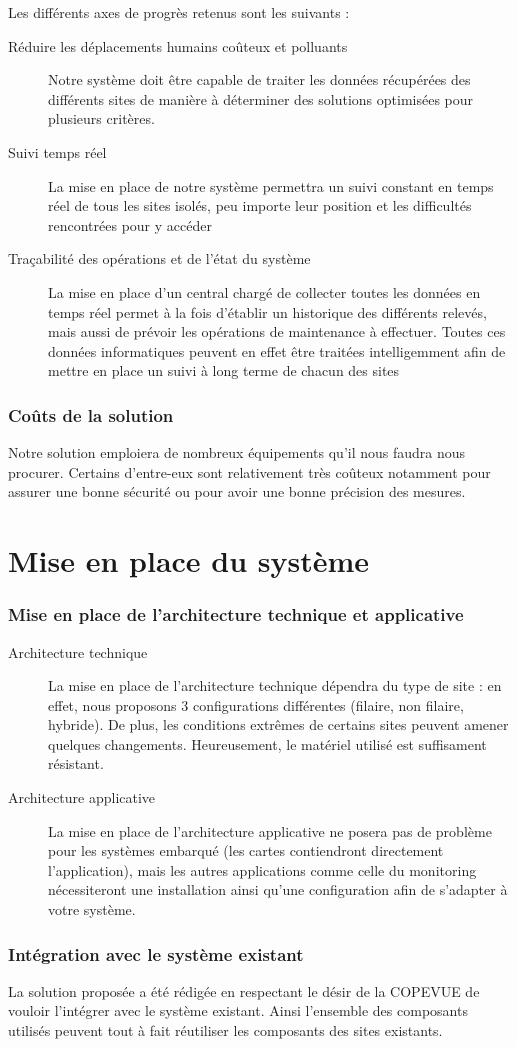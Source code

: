 \documentclass{mise_en_page}
\begin{document}
Les différents axes de progrès retenus sont les suivants :

\begin{description}
	\item[Réduire les déplacements humains coûteux et polluants]
		Notre système doit être capable de traiter les données récupérées des différents sites de manière à déterminer des solutions optimisées pour plusieurs critères.
	\item[Suivi temps réel]
		La mise en place de notre système permettra un suivi constant en temps réel de tous les sites isolés, peu importe leur position et les difficultés rencontrées pour y accéder
	\item[Traçabilité des opérations et de l’état du système]
		La mise en place d’un central chargé de collecter toutes les données en temps réel permet à la fois d’établir un historique des différents relevés, mais aussi de prévoir les opérations de maintenance à effectuer. Toutes ces données informatiques peuvent en effet être traitées intelligemment afin de mettre en place un suivi à long terme de chacun des sites
\end{description}

\subsubsection{Coûts de la solution}

Notre solution emploiera de nombreux équipements qu’il nous faudra nous procurer. Certains d’entre-eux sont relativement très coûteux notamment pour assurer une bonne sécurité ou pour avoir une bonne précision des mesures.

\section{Mise en place du système}

\subsubsection{Mise en place de l'architecture technique et applicative}

\begin{description}
	\item[Architecture technique]
		La mise en place de l'architecture technique dépendra du type de site : en effet, nous proposons 3 configurations différentes (filaire, non filaire, hybride). De plus, les conditions extrêmes de certains sites peuvent amener quelques changements. Heureusement, le matériel utilisé est suffisament résistant.
	\item[Architecture applicative]
		La mise en place de l'architecture applicative ne posera pas de problème pour les systèmes embarqué (les cartes contiendront directement l'application), mais les autres applications comme celle du monitoring nécessiteront une installation ainsi qu'une configuration afin de s'adapter à votre système.
\end{description}

\subsubsection{Intégration avec le système existant}

La solution proposée a été rédigée en respectant le désir de la COPEVUE de vouloir l'intégrer avec le système existant. Ainsi l'ensemble des composants utilisés peuvent tout à fait réutiliser les composants des sites existants.
\end{document}
